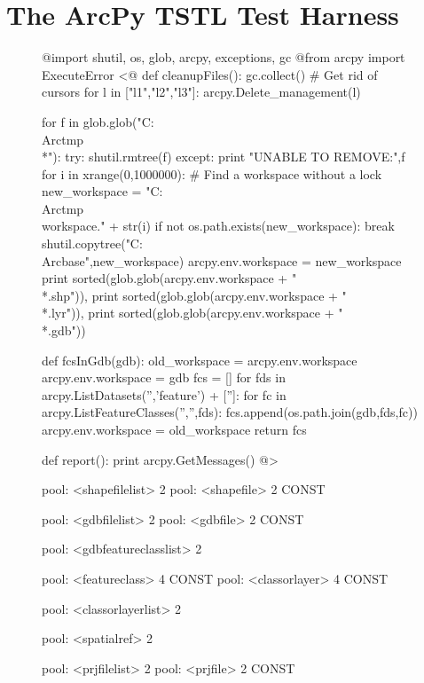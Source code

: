 \section{The ArcPy TSTL Test Harness}
\label{harness}

\begin{figure}
{\scriptsize
\begin{code}
@import shutil, os, glob, arcpy, exceptions, gc
@from arcpy import ExecuteError
<@
def cleanupFiles():
    gc.collect() \# Get rid of cursors
    for l in ["l1","l2","l3"]:
    	arcpy.Delete\_management(l)
    
    for f in glob.glob("C:\\Arctmp\\*"):
        try:
            shutil.rmtree(f)
        except:
            print "UNABLE TO REMOVE:",f
    for i in xrange(0,1000000): \# Find a workspace without a lock
        new\_workspace = "C:\\Arctmp\\workspace." + str(i)
        if not os.path.exists(new\_workspace):
            break             
    shutil.copytree("C:\\Arcbase",new\_workspace)
    arcpy.env.workspace = new\_workspace
    print sorted(glob.glob(arcpy.env.workspace + "\\*.shp")),
    print sorted(glob.glob(arcpy.env.workspace + "\\*.lyr")),
    print sorted(glob.glob(arcpy.env.workspace + "\\*.gdb"))


def fcsInGdb(gdb):
    old\_workspace = arcpy.env.workspace
    arcpy.env.workspace = gdb
    fcs = []
    for fds in arcpy.ListDatasets('','feature') + ['']:
        for fc in arcpy.ListFeatureClasses('','',fds):
            fcs.append(os.path.join(gdb,fds,fc))
    arcpy.env.workspace = old\_workspace
    return fcs

def report():
    print arcpy.GetMessages()
@>

pool: <shapefilelist> 2
pool: <shapefile> 2 CONST

pool: <gdbfilelist> 2
pool: <gdbfile> 2 CONST

pool: <gdbfeatureclasslist> 2

pool: <featureclass> 4 CONST
pool: <classorlayer> 4 CONST

pool: <classorlayerlist> 2

pool: <spatialref> 2

pool: <prjfilelist> 2
pool: <prjfile> 2 CONST


\end{code}}
\end{figure}
